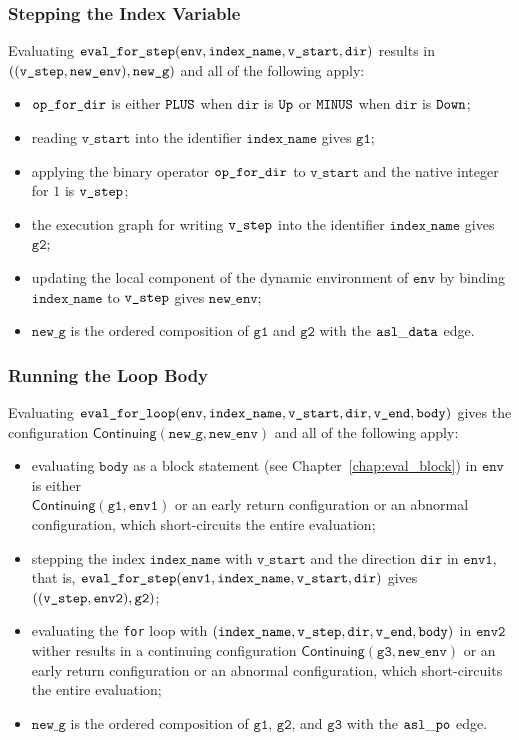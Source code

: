 \documentclass{book}
\newcommand\Continuing[0]{\textsf{Continuing}}
\newcommand\newenv[0]{\texttt{new\_env}}
\newcommand\env[0]{\texttt{env}}
\newcommand\envone[0]{\texttt{env1}}
\newcommand\envtwo[0]{\texttt{env2}}
\newcommand\newg[0]{\texttt{new\_g}}
\newcommand\vgone[0]{\texttt{g1}}
\newcommand\vgtwo[0]{\texttt{g2}}
\newcommand\vgthree[0]{\texttt{g3}}
\newcommand\vstart[0]{\texttt{v\_start}}
\newcommand\vend[0]{\texttt{v\_end}}
\newcommand\vbody[0]{\texttt{body}}
\newcommand\dir[0]{\texttt{dir}}
\newcommand\vindexname[0]{\texttt{index\_name}}
\begin{document}
\subsubsection{Stepping the Index Variable}
Evaluating $\evalforstep(\env, \vindexname, \vstart, \dir)$ results in \\ $((\vstep, \newenv), \newg)$
and all of the following apply:
\begin{itemize}
  \item $\texttt{op\_for\_dir}$ is either $\texttt{PLUS}$ when $\dir$ is $\texttt{Up}$ or $\texttt{MINUS}$ when $\dir$ is $\texttt{Down}$;
  \item reading $\vstart$ into the identifier $\vindexname$ gives $\vgone$;
  \item applying the binary operator $\texttt{op\_for\_dir}$ to $\vstart$ and the native integer for $1$ is $\texttt{v\_step}$;
  \item the execution graph for writing $\texttt{v\_step}$ into the identifier $\vindexname$ gives $\vgtwo$;
  \item updating the local component of the dynamic environment of $\env$ by binding \\ $\vindexname$ to $\texttt{v\_step}$
  gives $\newenv$;
  \item $\newg$ is the ordered composition of $\vgone$ and $\vgtwo$ with the $\mathtt{asl\_data}$ edge.
\end{itemize}

\subsubsection{Running the Loop Body}
Evaluating $\evalforloop(\env, \vindexname, \vstart, \dir, \vend, \vbody)$ gives the configuration
$\Continuing(\newg, \newenv)$
and all of the following apply:
\begin{itemize}
  \item evaluating $\vbody$ as a block statement (see Chapter~\ref{chap:eval_block}) in $\env$
  is either \\ $\Continuing(\vgone, \envone)$ or an early return configuration or an abnormal configuration,
  which short-circuits the entire evaluation;
  \item stepping the index $\vindexname$ with $\vstart$ and the direction $\dir$ in $\envone$,
  that is, $\evalforstep(\envone, \vindexname, \vstart, \dir)$ gives $((\vstep, \envtwo), \vgtwo)$;
  \item evaluating the \texttt{for} loop with $(\vindexname, \vstep, \dir, \vend, \vbody)$
  in $\envtwo$ wither results in a continuing configuration $\Continuing(\vgthree, \newenv)$
  or an early return configuration
  or an abnormal configuration, which short-circuits the entire evaluation;
  \item $\newg$ is the ordered composition of $\vgone$, $\vgtwo$, and $\vgthree$ with the $\mathtt{asl\_po}$
  edge.
\end{itemize}
\end{document}
